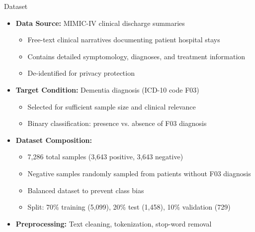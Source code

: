 \documentclass[
    10pt,
    aspectratio=169,
]{beamer}
\begin{document}
\begin{frame}{Dataset}
\begin{itemize}
    \item \textbf{Data Source:} MIMIC-IV clinical discharge summaries
    \begin{itemize}
        \item Free-text clinical narratives documenting patient hospital stays
        \item Contains detailed symptomology, diagnoses, and treatment information
        \item De-identified for privacy protection
    \end{itemize}
    \item \textbf{Target Condition:} Dementia diagnosis (ICD-10 code F03)
    \begin{itemize}
        \item Selected for sufficient sample size and clinical relevance
        \item Binary classification: presence vs. absence of F03 diagnosis
    \end{itemize}
    \item \textbf{Dataset Composition:}
    \begin{itemize}
        \item 7,286 total samples (3,643 positive, 3,643 negative)
        \item Negative samples randomly sampled from patients without F03 diagnosis
        \item Balanced dataset to prevent class bias
        \item Split: 70\% training (5,099), 20\% test (1,458), 10\% validation (729)
    \end{itemize}
    \item \textbf{Preprocessing:} Text cleaning, tokenization, stop-word removal
\end{itemize}
\end{frame}
\end{document}
